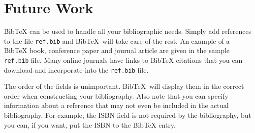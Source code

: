 \chapter{Future Work}
\label{chap:future}

\newcommand{\BibTeX}{Bib\TeX}

\BibTeX{} can be used to handle all your bibliographic needs.  Simply add
references to the file \texttt{ref.bib} and \BibTeX\ will take care of
the rest.  An example of a \BibTeX{} book, conference paper and journal
article are given in the sample \texttt{ref.bib} file.  Many online
journals have links to \BibTeX{} citations that you can download and
incorporate into the \texttt{ref.bib} file.

The order of the fields is unimportant. \BibTeX\ will display them
in the correct order when constructing your bibliography.  Also note
that you can specify information about a reference that may not even be
included in the actual bibliography.  For example, the ISBN field is not
required by the bibliography, but you can, if you want, put the ISBN to
the \BibTeX{} entry.

